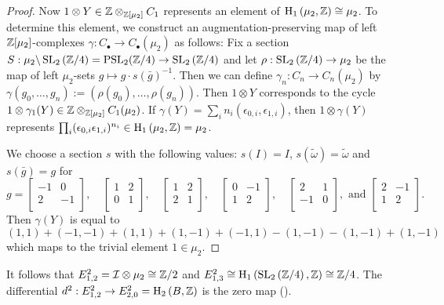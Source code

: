 \documentclass[12pt]{amsart}
\theoremstyle{definition}
\newcommand{\Z}{\Bbb{Z}}
\newcommand{\spl}[2]{\operatorname{SL}_{#1}\left(#2\right)}
\newcommand{\pspl}[2]{\mathrm{PSL}_{#1}(#2)}
\newcommand{\<}{\langle}
\renewcommand{\>}{\rangle}
\newcommand{\ho}[3]{\mathrm{H}_{#1}\left( #2,#3 \right)}
\begin{document}
\begin{proof}
Now $1\otimes Y\in \Z\otimes_{\Z[\mu_2]}C_1$ represents an element of $\ho{1}{\mu_2}{\Z}\cong\mu_2$. To determine this element, we construct an augmentation-preserving map of 
left $\Z[\mu_2]$-complexes $\gamma:C_\bullet\to C_\bullet(\mu_2)$ as follows:
Fix a section $S:\mu_2\backslash \spl{2}{\Z/4}=\pspl{2}{\Z/4}\to\spl{2}{\Z/4}$ and let $\rho:\spl{2}{\Z/4}\to\mu_2$ be the map of left $\mu_2$-sets $g\mapsto g\cdot s(\bar{g})^{-1}$.
Then we can define $\gamma_n:C_n\to C_n(\mu_2)$ by $\gamma(g_0,\ldots,g_n):=(\rho(g_0),\ldots,\rho(g_n))$. Then $1\otimes Y$ corresponds to the cycle $1\otimes \gamma_1(Y)\in \Z\otimes_{\Z[\mu_2]} C_1(\mu_2)$. If $\gamma(Y)=\sum_i n_i(\epsilon_{0,i},\epsilon_{1,i})$, then $1\otimes\gamma(Y)$ represents $\prod_i(\epsilon_{0,i}\epsilon_{1,i})^{n_i}\in \ho{1}{\mu_2}{\Z}=\mu_2$.

We choose a section $s$ with the following values: $s(I)=I$, $s(\tilde{\omega})=\tilde{\omega}$ and $s(\bar{g})=g$ for 
\[
g=\left[
\begin{array}{cc}
-1&0\\
2&-1\\
\end{array}
\right],\quad 
\left[
\begin{array}{cc}
1&2\\
0&1\\
\end{array}
\right],\quad
\left[
\begin{array}{cc}
1&2\\
2&1\\
\end{array}
\right],\quad
\left[
\begin{array}{cc}
0&-1\\
1&2\\
\end{array}
\right],\quad
\left[
\begin{array}{cc}
2&1\\
-1&0\\
\end{array}
\right],\mbox{ and }
\left[
\begin{array}{cc}
2&-1\\
1&2\\
\end{array}
\right].
\]
Then $\gamma(Y)$ is equal to
\[
(1,1)+(-1,-1)+(1,1)+(1,-1)+(-1,1)-(1,-1)-(1,-1)+(1,-1)
\]
which maps to the trivial element $1\in \mu_2$.
\end{proof}

It follows that $E^2_{1,2}=\mathcal{I}\otimes\mu_2\cong\Z/2$ and $E^2_{1,3}\cong\ho{1}{\spl{2}{\Z/4}}{\Z}\cong\Z/4$.
The differential $d^2:E^2_{1,2}\to E^2_{2,0}=\ho{2}{B}{\Z}$ is the zero map (\cite[Corollary A.9]{hut:bloch1}).
\end{document}
